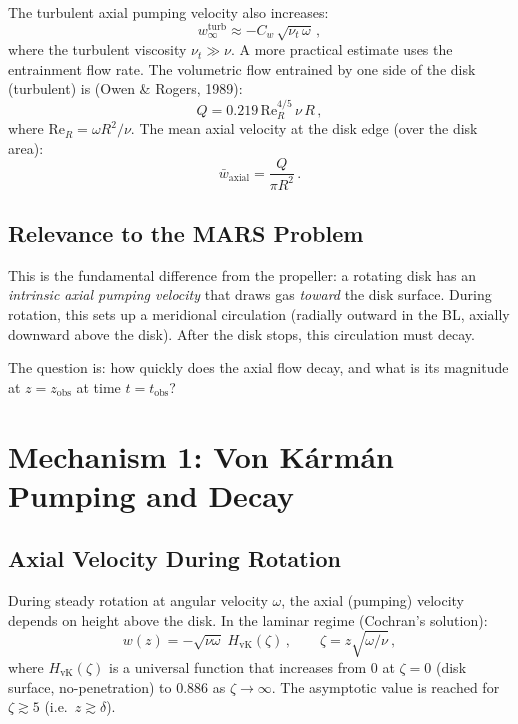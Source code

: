 \documentclass[11pt,a4paper]{article}
\begin{document}
The turbulent axial pumping velocity also increases:
\begin{equation}
  w_\infty^\mathrm{turb} \approx -C_w\,\sqrt{\nu_t\,\omega}\,,
  \label{eq:w_inf_turb}
\end{equation}
where the turbulent viscosity $\nu_t \gg \nu$. A more practical
estimate uses the entrainment flow rate. The volumetric flow entrained
by one side of the disk (turbulent) is
(Owen \& Rogers, 1989):
\begin{equation}
  Q = 0.219\,\mathrm{Re}_R^{4/5}\,\nu\,R\,,
  \label{eq:Q_turb}
\end{equation}
where $\mathrm{Re}_R = \omega R^2 / \nu$. The mean axial velocity at
the disk edge (over the disk area):
\begin{equation}
  \bar{w}_\mathrm{axial} = \frac{Q}{\pi R^2}\,.
  \label{eq:w_mean}
\end{equation}

\subsection{Relevance to the MARS Problem}

This is the fundamental difference from the propeller: a rotating
disk has an \emph{intrinsic axial pumping velocity} that draws gas
\emph{toward} the disk surface. During rotation, this sets up a
meridional circulation (radially outward in the BL, axially downward
above the disk). After the disk stops, this circulation must decay.

The question is: how quickly does the axial flow decay, and what is its
magnitude at $z = z_\mathrm{obs}$ at time $t = t_\mathrm{obs}$?


\section{Mechanism 1: Von K\'arm\'an Pumping and Decay}
\label{sec:pumping}

\subsection{Axial Velocity During Rotation}

During steady rotation at angular velocity $\omega$, the axial
(pumping) velocity depends on height above the disk. In the laminar
regime (Cochran's solution):
\begin{equation}
  w(z) = -\sqrt{\nu\omega}\;H_\mathrm{vK}(\zeta)\,,
  \qquad \zeta = z\sqrt{\omega/\nu}\,,
\end{equation}
where $H_\mathrm{vK}(\zeta)$ is a universal function that increases
from $0$ at $\zeta = 0$ (disk surface, no-penetration) to $0.886$ as
$\zeta \to \infty$. The asymptotic value is reached for
$\zeta \gtrsim 5$ (i.e.\ $z \gtrsim \delta$).
\end{document}
